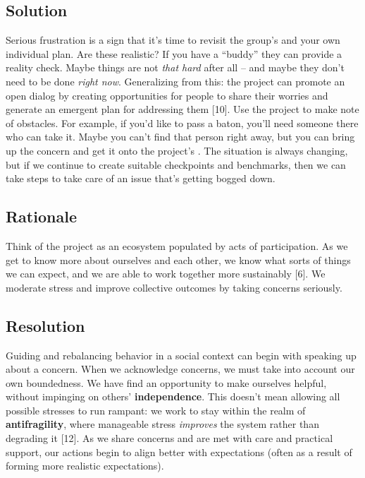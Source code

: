 \hypertarget{solution}{%
\subsection{Solution}\label{solution}}

Serious frustration is a sign that it's time to revisit the group's and
your own individual plan. Are these realistic? If you have a ``buddy''
they can provide a reality check. Maybe things are not \emph{that hard}
after all -- and maybe they don't need to be done \emph{right now}.
Generalizing from this: the project can promote an open dialog by
creating opportunities for people to share their worries and generate an
emergent plan for addressing them {{[}10{]}}. Use the project to make
note of obstacles. For example, if you'd like to pass a baton, you'll
need someone there who can take it. Maybe you can't find that person
right away, but you can bring up the concern and get it onto the
project's . The situation is always changing, but if we continue to
create suitable checkpoints and benchmarks, then we can take steps to
take care of an issue that's getting bogged down.

\hypertarget{rationale}{%
\subsection{Rationale}\label{rationale}}

Think of the project as an ecosystem populated by acts of participation.
As we get to know more about ourselves and each other, we know what
sorts of things we can expect, and we are able to work together more
sustainably {{[}6{]}}. We moderate stress and improve collective
outcomes by taking concerns seriously.

\hypertarget{resolution}{%
\subsection{Resolution}\label{resolution}}

Guiding and rebalancing behavior in a social context can begin with
speaking up about a concern. When we acknowledge concerns, we must take
into account our own boundedness. We have find an opportunity to make
ourselves helpful, without impinging on others' \textbf{independence}.
This doesn't mean allowing all possible stresses to run rampant: we work
to stay within the realm of \textbf{antifragility}, where manageable
stress \emph{improves} the system rather than degrading it {{[}12{]}}.
As we share concerns and are met with care and practical support, our
actions begin to align better with expectations (often as a result of
forming more realistic expectations).


